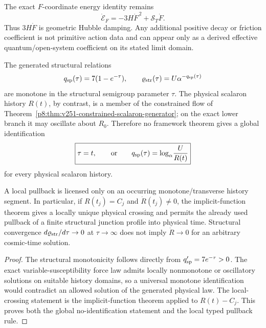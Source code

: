 \documentclass[12pt,a4paper]{article}
\begin{document}
\begin{corollary}
\label{p8:cor:v251-positive-trace-downward-work}
The exact $F$-coordinate energy identity remains
\[
 \boxed{\dot{\mathcal E}_F=-3H\dot F^{\,2}+\mathcal S_T\dot F.}
\]
Thus $3H\dot F$ is geometric Hubble damping.  Any additional positive decay
or friction coefficient is not primitive action data and can appear only as
a derived effective quantum/open-system coefficient on its stated limit
domain.
\end{corollary}

\begin{theorem}
\label{p8:thm:v251-structural-physical-time-firewall}
The generated structural relations
\[
 q_{\rm sp}(\tau)=7(1-e^{-\tau}),
 \qquad
 \varrho_{\rm str}(\tau)=U\alpha^{-q_{\rm sp}(\tau)}
\]
are monotone in the structural semigroup parameter \(\tau\).  The physical
scalaron history \(R(t)\), by contrast, is a member of the constrained flow of
Theorem~\ref{p8:thm:v251-constrained-scalaron-generator}; on the exact lower
branch it may oscillate about \(R_0\).  Therefore no framework theorem gives a
global identification
\begin{equation}
\label{p8:eq:v251-no-global-tau-time-id}
 \boxed{
 \tau=t,
 \qquad\text{or}\qquad
 q_{\rm sp}(\tau)=\log_\alpha\!\frac{U}{R(t)}}
\end{equation}
for every physical scalaron history.

A local pullback is licensed only on an occurring monotone/transverse history
segment.  In particular, if \(R(t_j)=C_j\) and \(\dot R(t_j)\ne0\), the
implicit-function theorem gives a locally unique physical crossing and permits
the already used pullback of a finite structural junction profile into
physical time.  Structural convergence
\(d\varrho_{\rm str}/d\tau\to0\) at \(\tau\to\infty\) does not imply
\(\dot R\to0\) for an arbitrary cosmic-time solution.
\end{theorem}

\begin{proof}
The structural monotonicity follows directly from
\(q_{\rm sp}'=7e^{-\tau}>0\).  The exact variable-susceptibility force law admits locally nonmonotone or oscillatory solutions on suitable history domains, so a universal monotone identification would contradict an allowed solution of the generated physical law.  The local-crossing statement
is the implicit-function theorem applied to \(R(t)-C_j\).  This proves both
the global no-identification statement and the local typed pullback rule.
\end{proof}
\end{document}
